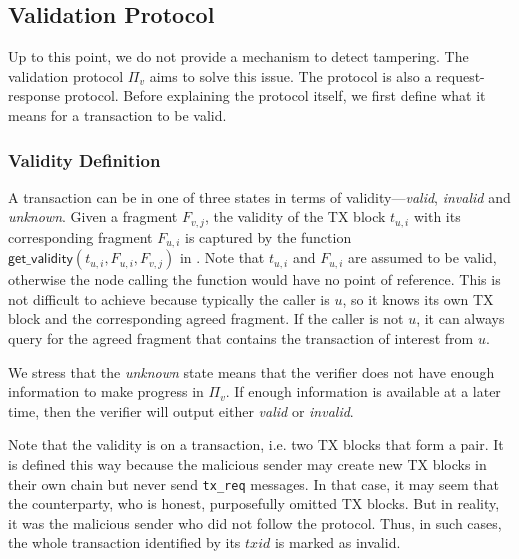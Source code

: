 \subsection{Validation Protocol}
\label{sec:vd-protocol}

Up to this point, we do not provide a mechanism to detect tampering.
The validation protocol $\Pi_v$ aims to solve this issue.
The protocol is also a request-response protocol.
Before explaining the protocol itself, we first define what it means for a transaction to be valid.

\subsubsection{Validity Definition}
A transaction can be in one of three states in terms of validity---\emph{valid}, \emph{invalid} and \emph{unknown}.
Given a fragment $F_{v, j}$,
the validity of the TX block $t_{u, i}$ with its corresponding fragment $F_{u, i}$ is captured by the function $\textsf{get\_validity}(t_{u, i}, F_{u, i}, F_{v, j})$ in .
Note that $t_{u, i}$ and $F_{u, i}$ are assumed to be valid,
otherwise the node calling the function would have no point of reference.
This is not difficult to achieve because typically the caller is $u$,
so it knows its own TX block and the corresponding agreed fragment.
If the caller is not $u$, it can always query for the agreed fragment that contains the transaction of interest from $u$.


We stress that the \emph{unknown} state means that the verifier does not have enough information to make progress in $\Pi_v$.
If enough information is available at a later time, then the verifier will output either \emph{valid} or \emph{invalid}.

Note that the validity is on a transaction, i.e. two TX blocks that form a pair.
It is defined this way because the malicious sender may create new TX blocks in their own chain but never send \texttt{tx\_req} messages.
In that case, it may seem that the counterparty, who is honest, purposefully omitted TX blocks.
But in reality, it was the malicious sender who did not follow the protocol.
Thus, in such cases, the whole transaction identified by its $txid$ is marked as invalid.

